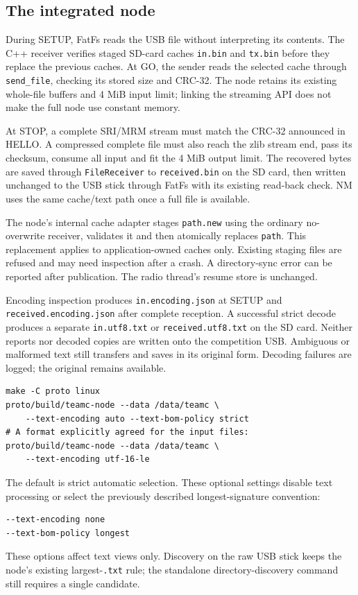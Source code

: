 \documentclass[10pt,a4paper]{article}
\begin{document}
\subsection{The integrated node}
During SETUP, FatFs reads the USB file without interpreting its contents.
The C++ receiver verifies staged SD-card caches \texttt{in.bin} and
\texttt{tx.bin} before they replace the previous caches. At GO, the sender reads
the selected cache through \texttt{send\_file}, checking its stored size and CRC-32.
The node retains its existing whole-file buffers and 4 MiB input limit; linking
the streaming API does not make the full node use constant memory.

At STOP, a complete SRI/MRM stream must match the CRC-32 announced in HELLO.
A compressed complete file must also reach the zlib stream end, pass its checksum,
consume all input and fit the 4 MiB output limit. The recovered bytes are saved
through \texttt{FileReceiver} to \texttt{received.bin} on the SD card, then written
unchanged to the USB stick through FatFs with its existing read-back check.
NM uses the same cache/text path once a full file is available.

The node's internal cache adapter stages \texttt{path.new} using the ordinary
no-overwrite receiver, validates it and then atomically replaces \texttt{path}.
This replacement applies to application-owned caches only. Existing staging files
are refused and may need inspection after a crash. A directory-sync error can be
reported after publication. The radio thread's resume store is unchanged.

Encoding inspection produces \texttt{in.encoding.json} at SETUP and
\texttt{received.encoding.json} after complete reception. A successful strict
decode produces a separate \texttt{in.utf8.txt} or \texttt{received.utf8.txt} on the
SD card. Neither reports nor decoded copies are written onto the competition USB.
Ambiguous or malformed text still transfers and saves in its original form.
Decoding failures are logged; the original remains available.

\begin{verbatim}
make -C proto linux
proto/build/teamc-node --data /data/teamc \
    --text-encoding auto --text-bom-policy strict
# A format explicitly agreed for the input files:
proto/build/teamc-node --data /data/teamc \
    --text-encoding utf-16-le
\end{verbatim}
\begin{minipage}{\linewidth}
The default is strict automatic selection. These optional settings disable text
processing or select the previously described longest-signature convention:
\begin{verbatim}
--text-encoding none
--text-bom-policy longest
\end{verbatim}
\end{minipage}
These options affect text views only. Discovery
on the raw USB stick keeps the node's existing largest-\texttt{.txt} rule; the
standalone directory-discovery command still requires a single candidate.
\end{document}
